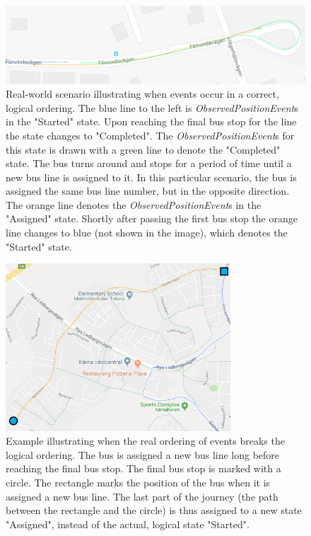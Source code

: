 \begin{figure}[h!]
    \centering
    \includegraphics[width=1\textwidth]{figures/assigned_completed_working}
    \caption{Real-world scenario illustrating when events occur in a correct, logical ordering.
    The blue line to the left is \textit{ObservedPositionEvent}s in the "Started" state.
    Upon reaching the final bus stop for the line the state changes to "Completed".
    The \textit{ObservedPositionEvent}s for this state is drawn with a green line to denote the "Completed" state.
    The bus turns around and stops for a period of time until a new bus line is assigned to it.
    In this particular scenario, the bus is assigned the same bus line number, but in the opposite direction.
    The orange line denotes the \textit{ObservedPositionEvent}s in the "Assigned" state.
    Shortly after passing the first bus stop the orange line changes to blue (not shown in the image), which denotes the "Started" state.}
    \label{fig:assigned-before-completed-working}
\end{figure}

\begin{figure}[t!]
    \centering
    \includegraphics[width=0.75\textwidth]{figures/assigned_completed_problem_long}
    \caption{Example illustrating when the real ordering of events breaks the logical ordering.
    The bus is assigned a new bus line long before reaching the final bus stop.
    The final bus stop is marked with a circle.
    The rectangle marks the position of the bus when it is assigned a new bus line.
    The last part of the journey (the path between the rectangle and the circle) is thus assigned to a new state "Assigned", instead of the actual, logical state "Started".}
    \label{fig:assigned-before-completed-long}
\end{figure}

